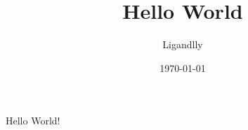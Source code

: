 \documentclass[a4paper]{article}
\title{Hello World}
\author{Ligandlly}
\date{\today}
\begin{document}
\maketitle

Hello World!
\end{document}

